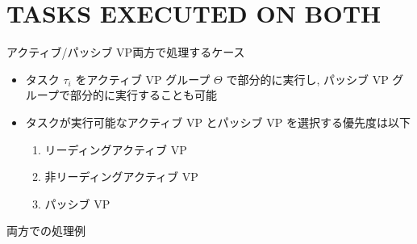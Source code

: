 
\section{TASKS EXECUTED ON BOTH}
\label{sec: tasks executed on both}

\begin{frame}{アクティブ/パッシブ VP両方で処理するケース}
    \begin{itemize}
        \item タスク $\tau_{i}$ をアクティブ VP グループ $\Theta$ で部分的に実行し, パッシブ VP グループで部分的に実行することも可能
        \item タスクが実行可能なアクティブ VP とパッシブ VP を選択する優先度は以下
        \begin{enumerate}
            \item リーディングアクティブ VP
            \item 非リーディングアクティブ VP
            \item パッシブ VP
        \end{enumerate}
    \end{itemize}
\end{frame}

\begin{frame}{両方での処理例}
\end{frame}

